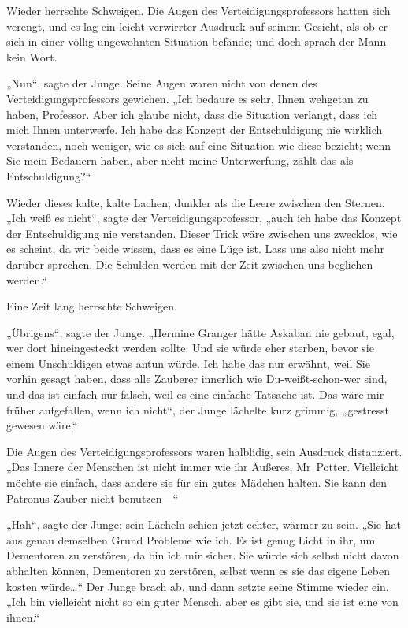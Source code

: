 {Wieder herrschte Schweigen. Die Augen des Verteidigungsprofessors hatten sich verengt, und es lag ein leicht verwirrter Ausdruck auf seinem Gesicht, als ob er sich in einer völlig ungewohnten Situation befände; und doch sprach der Mann kein Wort.

„Nun“, sagte der Junge. Seine Augen waren nicht von denen des Verteidigungsprofessors gewichen. „Ich bedaure es sehr, Ihnen wehgetan zu haben, Professor. Aber ich glaube nicht, dass die Situation verlangt, dass ich mich Ihnen unterwerfe. Ich habe das Konzept der Entschuldigung nie wirklich verstanden, noch weniger, wie es sich auf eine Situation wie diese bezieht; wenn Sie mein Bedauern haben, aber nicht meine Unterwerfung, zählt das als Entschuldigung?“

Wieder dieses kalte, kalte Lachen, dunkler als die Leere zwischen den Sternen. „Ich weiß es nicht“, sagte der Verteidigungsprofessor, „auch ich habe das Konzept der Entschuldigung nie verstanden. Dieser Trick wäre zwischen uns zwecklos, wie es scheint, da wir beide wissen, dass es eine Lüge ist. Lass uns also nicht mehr darüber sprechen. Die Schulden werden mit der Zeit zwischen uns beglichen werden.“

Eine Zeit lang herrschte Schweigen.

„Übrigens“, sagte der Junge. „Hermine Granger hätte Askaban nie gebaut, egal, wer dort hineingesteckt werden sollte. Und sie würde eher sterben, bevor sie einem Unschuldigen etwas antun würde. Ich habe das nur erwähnt, weil Sie vorhin gesagt haben, dass alle Zauberer innerlich wie Du-weißt-schon-wer sind, und das ist einfach nur falsch, weil es eine einfache Tatsache ist. Das wäre mir früher aufgefallen, wenn ich nicht“, der Junge lächelte kurz grimmig, „gestresst gewesen wäre.“

Die Augen des Verteidigungsprofessors waren halblidig, sein Ausdruck distanziert. „Das Innere der Menschen ist nicht immer wie ihr Äußeres, Mr~Potter. Vielleicht möchte sie einfach, dass andere sie für ein gutes Mädchen halten. Sie kann den Patronus-Zauber nicht benutzen—“

„Hah“, sagte der Junge; sein Lächeln schien jetzt echter, wärmer zu sein. „Sie hat aus genau demselben Grund Probleme wie ich. Es ist genug Licht in ihr, um Dementoren zu zerstören, da bin ich mir sicher. Sie würde sich selbst nicht davon abhalten können, Dementoren zu zerstören, selbst wenn es sie das eigene Leben kosten würde…“ Der Junge brach ab, und dann setzte seine Stimme wieder ein. „Ich bin vielleicht nicht so ein guter Mensch, aber es gibt sie, und sie ist eine von ihnen.“

}
